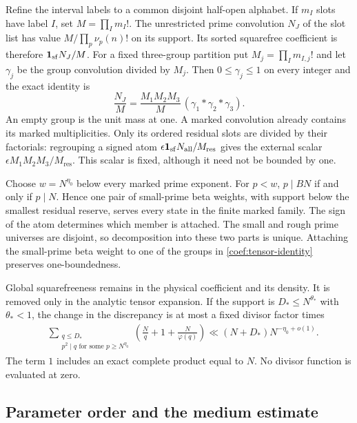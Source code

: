 Refine the interval labels to a common disjoint half-open alphabet.
If $m_I$ slots have label $I$, set $M=\prod_I m_I!$.
The unrestricted prime convolution $N_J$ of the slot list has value
$M/\prod_p\nu_p(n)!$ on its support.  Its sorted squarefree coefficient
is therefore $\mathbf 1_{\mathrm{sf}}N_J/M$.  For a fixed three-group
partition put $M_j=\prod_I m_{I,j}!$ and let $\gamma_j$ be the group
convolution divided by $M_j$.  Then $0\le\gamma_j\le1$ on every integer
and the exact identity is
\begin{equation}
 \frac{N_J}{M}
 =\frac{M_1M_2M_3}{M}\,
       (\gamma_1*\gamma_2*\gamma_3).
 \label{coef:tensor-identity}
\end{equation}
An empty group is the unit mass at one.  A marked convolution already
contains its marked multiplicities.  Only its ordered residual slots
are divided by their factorials: regrouping a signed atom
$\epsilon\mathbf 1_{\mathrm{sf}}N_{\mathrm{all}}/M_{\mathrm{res}}$
gives the external scalar $\epsilon M_1M_2M_3/M_{\mathrm{res}}$.
This scalar is fixed, although it need not be bounded by one.

Choose $w=N^{\eta_0}$ below every marked prime exponent.  For $p<w$,
$p\mid BN$ if and only if $p\mid N$. Hence one pair of small-prime
beta weights, with support below the smallest residual reserve, serves
every state in the finite marked family.  The sign of the atom determines
which member is attached.  The small and rough prime universes are
disjoint, so decomposition into these two parts is unique.  Attaching
the small-prime beta weight to one of the groups in
\eqref{coef:tensor-identity} preserves one-boundedness.

Global squarefreeness remains in the physical coefficient and its density.
It is removed only in the analytic tensor expansion.  If the support is
$D_*\le N^{\theta_*}$ with $\theta_*<1$, the change in the discrepancy
is at most a fixed divisor factor times
\begin{align}
 &\sum_{\substack{q\le D_*\\p^2\mid q\text{ for some }p\ge N^{\eta_0}}}
 \left(\frac{N}{q}+1+\frac{N}{\varphi(q)}\right)
 \ll (N+D_*)N^{-\eta_0+o(1)}.
 \label{coef:collision}
\end{align}
The term $1$ includes an exact complete product equal to $N$.
No divisor function is evaluated at zero.

\subsection{Parameter order and the medium estimate}

